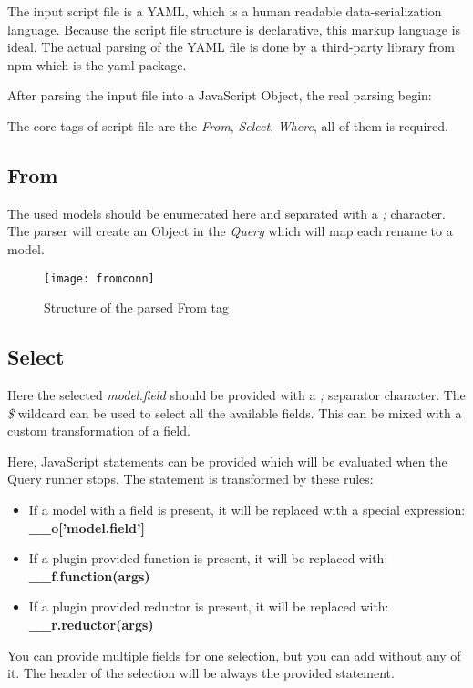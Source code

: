 The input script file is a YAML\cite{yaml}, which is a human readable data-serialization language. Because the script file structure is declarative,
this markup language is ideal. The actual parsing of the YAML file is done by
a third-party library from npm which is the yaml\cite{yaml-pck} package.

After parsing the input file into a JavaScript Object, the real parsing begin: 

The core tags of script file are the \textit{From}, \textit{Select}, \textit{Where}, all of them is required.
\newpage
\subsection{From}
The used models should be enumerated here and separated with a \textit{;} character. The parser will create an Object in the \textit{Query} which will map each rename to a model.

\begin{figure}[H]
	\centering
	\texttt{[image: fromconn]}
	\caption{Structure of the parsed From tag}
	\label{fig:fig-help}
\end{figure}

\subsection{Select}
Here the selected \textit{model.field} should be provided with a \textit{;} 
separator character. The \textit{\$} wildcard can be used to select all the
available fields. This can be mixed with a custom transformation of a field.

Here, JavaScript statements can be provided which will be evaluated when the
Query runner stops. The statement is transformed by these rules:

\begin{itemize}
	\item If a model with a field is present, it will be replaced with a special expression: \textbf{\_\_o['model.field']}
	\item If a plugin provided function is present, it will be replaced with: \textbf{\_\_f.function(args)}
	\item If a plugin provided reductor is present, it will be replaced with: \textbf{\_\_r.reductor(args)}
\end{itemize}

You can provide multiple fields for one selection, but you can add without any of it. The header of the selection
will be always the provided statement.

